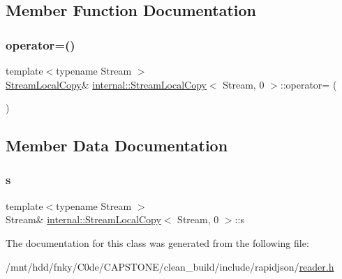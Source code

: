 \subsection{Member Function Documentation}
\mbox{\label{classinternal_1_1StreamLocalCopy_3_01Stream_00_010_01_4_a951778536f05d1f818f67c1c0342858c}} 
\subsubsection{\texorpdfstring{operator=()}{operator=()}}
{\footnotesize\ttfamily template$<$typename Stream $>$ \\
\hyperlink{classinternal_1_1StreamLocalCopy}{Stream\+Local\+Copy}\& \hyperlink{classinternal_1_1StreamLocalCopy}{internal\+::\+Stream\+Local\+Copy}$<$ Stream, 0 $>$\+::operator= (\begin{DoxyParamCaption}\item[{const \hyperlink{classinternal_1_1StreamLocalCopy}{Stream\+Local\+Copy}$<$ Stream, 0 $>$ \&}]{ }\end{DoxyParamCaption})\hspace{0.3cm}{\ttfamily [private]}}



\subsection{Member Data Documentation}
\mbox{\label{classinternal_1_1StreamLocalCopy_3_01Stream_00_010_01_4_ad31147888384f4bd51eabc2d7acdc4b6}} 
\subsubsection{\texorpdfstring{s}{s}}
{\footnotesize\ttfamily template$<$typename Stream $>$ \\
Stream\& \hyperlink{classinternal_1_1StreamLocalCopy}{internal\+::\+Stream\+Local\+Copy}$<$ Stream, 0 $>$\+::s}



The documentation for this class was generated from the following file\+:\begin{DoxyCompactItemize}
\item 
/mnt/hdd/fnky/\+C0de/\+C\+A\+P\+S\+T\+O\+N\+E/clean\+\_\+build/include/rapidjson/\hyperlink{reader_8h}{reader.\+h}\end{DoxyCompactItemize}
